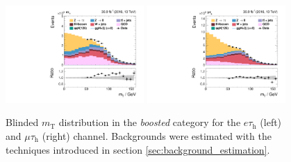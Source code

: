 \begin{figure}[h!]
 \centering
  \includegraphics[width=0.47\textwidth]{Figures/background_estimation/control_plots/et/BoostedCP/mt_1.pdf}
  \includegraphics[width=0.47\textwidth]{Figures/background_estimation/control_plots/mt/BoostedCP/mt_1.pdf}
 \caption[\textit{W+jets} control plots in the \textit{boosted} category.]{Blinded $m_\text{T}$ distribution in the \textit{boosted} category for the $e\tau_\text{h}$ (left) and $\mu\tau_\text{h}$ (right) channel.
 Backgrounds were estimated with the techniques introduced in section \ref{sec:background_estimation}.}\label{fig:etmt_wj:wj_control_1jet}
\end{figure}

